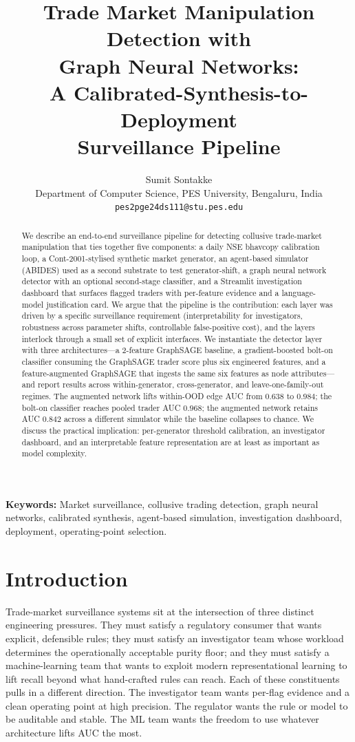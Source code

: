 \documentclass[10pt,twocolumn,letterpaper]{article}
\title{Trade Market Manipulation Detection with\\
Graph Neural Networks:\\
A Calibrated-Synthesis-to-Deployment\\
Surveillance Pipeline}
\author{Sumit Sontakke\\
\small Department of Computer Science, PES University, Bengaluru, India\\
\small \texttt{pes2pge24ds111@stu.pes.edu}}
\begin{document}
\maketitle

\begin{abstract}
We describe an end-to-end surveillance pipeline for detecting collusive
trade-market manipulation that ties together five components: a daily
NSE bhavcopy calibration loop, a Cont-2001-stylised synthetic market
generator, an agent-based simulator (ABIDES) used as a second substrate
to test generator-shift, a graph neural network detector with an
optional second-stage classifier, and a Streamlit investigation
dashboard that surfaces flagged traders with per-feature evidence and a
language-model justification card. We argue that the pipeline is the
contribution: each layer was driven by a specific surveillance
requirement (interpretability for investigators, robustness across
parameter shifts, controllable false-positive cost), and the layers
interlock through a small set of explicit interfaces. We instantiate
the detector layer with three architectures---a 2-feature GraphSAGE
baseline, a gradient-boosted bolt-on classifier consuming the GraphSAGE
trader score plus six engineered features, and a feature-augmented
GraphSAGE that ingests the same six features as node attributes---and
report results across within-generator, cross-generator, and
leave-one-family-out regimes. The augmented network lifts within-OOD
edge AUC from \(0.638\) to \(0.984\); the bolt-on classifier reaches
pooled trader AUC \(0.968\); the augmented network retains AUC
\(0.842\) across a different simulator while the baseline collapses to
chance. We discuss the practical implication: per-generator threshold
calibration, an investigator dashboard, and an interpretable feature
representation are at least as important as model complexity.
\end{abstract}

\vspace{0.5em}\noindent\textbf{Keywords:}
Market surveillance, collusive trading detection, graph neural networks,
calibrated synthesis, agent-based simulation, investigation dashboard,
deployment, operating-point selection.

\section{Introduction}
\label{sec:intro}

Trade-market surveillance systems sit at the intersection of three
distinct engineering pressures. They must satisfy a regulatory consumer
that wants explicit, defensible rules; they must satisfy an investigator
team whose workload determines the operationally acceptable purity
floor; and they must satisfy a machine-learning team that wants to
exploit modern representational learning to lift recall beyond what
hand-crafted rules can reach. Each of these constituents pulls in a
different direction. The investigator team wants per-flag evidence and
a clean operating point at high precision. The regulator wants the rule
or model to be auditable and stable. The ML team wants the freedom to
use whatever architecture lifts AUC the most.
\end{document}
